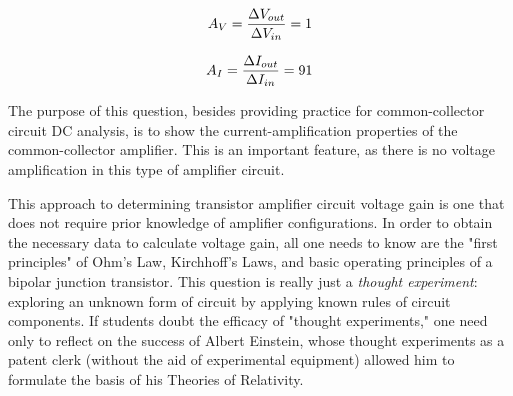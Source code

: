 $$A_V = {\Delta V_{out} \over \Delta V_{in}} = 1$$

$$A_I = {\Delta I_{out} \over \Delta I_{in}} = 91$$







The purpose of this question, besides providing practice for common-collector circuit DC analysis, is to show the current-amplification properties of the common-collector amplifier.  This is an important feature, as there is no voltage amplification in this type of amplifier circuit.

This approach to determining transistor amplifier circuit voltage gain is one that does not require prior knowledge of amplifier configurations.  In order to obtain the necessary data to calculate voltage gain, all one needs to know are the "first principles" of Ohm's Law, Kirchhoff's Laws, and basic operating principles of a bipolar junction transistor.  This question is really just a {\it thought experiment}: exploring an unknown form of circuit by applying known rules of circuit components.  If students doubt the efficacy of "thought experiments," one need only to reflect on the success of Albert Einstein, whose thought experiments as a patent clerk (without the aid of experimental equipment) allowed him to formulate the basis of his Theories of Relativity.




